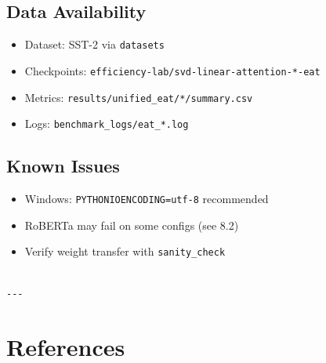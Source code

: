 \subsection{Data Availability}

\begin{itemize}
\item Dataset: SST-2 via \texttt{datasets}
\item Checkpoints: \texttt{efficiency-lab/svd-linear-attention-*-eat}
\item Metrics: \texttt{results/unified\_eat/*/summary.csv}
\item Logs: \texttt{benchmark\_logs/eat\_*.log}

\end{itemize}
\subsection{Known Issues}

\begin{itemize}
\item Windows: \texttt{PYTHONIOENCODING=utf-8} recommended
\item RoBERTa may fail on some configs (see  8.2)
\item Verify weight transfer with \texttt{sanity\_check}
\end{itemize}
\begin{lstlisting}

---
\end{lstlisting}


\section{References}

